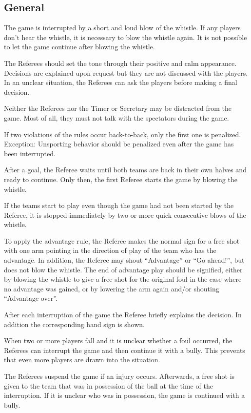 \subsection{General}
The game is interrupted by a short and loud blow of the whistle.
If any players don't hear the whistle, it is necessary to blow the whistle again.
It is not possible to let the game continue after blowing the whistle.

The Referees should set the tone through their positive and calm appearance.
Decisions are explained upon request but they are not discussed with the players.
In an unclear situation, the Referees can ask the players before making a final decision.

Neither the Referees nor the Timer or Secretary may be distracted from the game.
Most of all, they must not talk with the spectators during the game.

If two violations of the rules occur back-to-back, only the first one is penalized.
Exception: Unsporting behavior should be penalized even after the game has been interrupted.

After a goal, the Referee waits until both teams are back in their own halves and ready to continue.
Only then, the first Referee starts the game by blowing the whistle.

If the teams start to play even though the game had not been started by the Referee, it is stopped immediately by two or more quick consecutive blows of the whistle.

To apply the advantage rule, the Referee makes the normal sign for a free shot with one arm pointing in the direction of play of the team who has the advantage.
In addition, the Referee may shout ``Advantage'' or ``Go ahead!'', but does not blow the whistle.
The end of advantage play should be signified, either by blowing the whistle to give a free shot for the original foul in the case where no advantage was gained, or by lowering the arm again and/or shouting ``Advantage over''.

After each interruption of the game the Referee briefly explains the decision.
In addition the corresponding hand sign is shown.

When two or more players fall and it is unclear whether a foul occurred, the Referees can interrupt the game and then continue it with a bully.
This prevents that even more players are drawn into the situation.

The Referees suspend the game if an injury occurs.
Afterwards, a free shot is given to the team that was in possession of the ball at the time of the interruption.
If it is unclear who was in possession, the game is continued with a bully.

